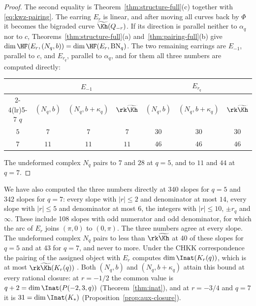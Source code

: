 \begin{proof}
The second equality is Theorem~\ref{thm:structure-full}(c) together with \eqref{eq:kwz-pairing}.  The
earring $E_r$ is linear, and after moving all curves back by $\Phi$ it becomes the bigraded curve
$\widetilde{\Kh}(Q_{-r})$.  If its direction is parallel neither to $\alpha_q$ nor to $c$,
Theorems~\ref{thm:structure-full}(a) and~\ref{thm:pairing-full}(b) give
$\dim\HF(E_r,(N_q,b))=\dim\HF(E_r,\mathrm{BN}_q)$.  The two remaining earrings are $E_{-1}$, parallel
to $c$, and $E_{r_q}$, parallel to $\alpha_q$, and for them all three numbers are computed directly:
\begin{center}
\begin{tabular}{ccccccc}
\toprule
 & \multicolumn{3}{c}{$E_{-1}$} & \multicolumn{3}{c}{$E_{r_q}$}\\
\cmidrule(lr){2-4}\cmidrule(lr){5-7}
$q$ & $(N_q,b)$ & $(N_q,b+\kappa_q)$ & $\rk\widetilde{\Kh}$ & $(N_q,b)$ & $(N_q,b+\kappa_q)$ &
 $\rk\widetilde{\Kh}$\\
\midrule
$5$ & $7$ & $7$ & $7$ & $30$ & $30$ & $30$\\
$7$ & $11$ & $11$ & $11$ & $46$ & $46$ & $46$\\
\bottomrule
\end{tabular}
\end{center}
The undeformed complex $N_q$ pairs to $7$ and $28$ at $q=5$, and to $11$ and $44$ at $q=7$.
\end{proof}

We have also computed the three numbers directly at 340 slopes for $q=5$ and 342 slopes for $q=7$:
every slope with $|r|\le2$ and denominator at most $14$, every slope with $|r|\le5$ and denominator
at most $6$, the integers with $|r|\le10$, $\pm r_q$ and $\infty$.  These include 108 slopes with odd
numerator and odd denominator, for which the arc of $E_r$ joins $(\pi,0)$ to $(0,\pi)$.  The three numbers agree
at every slope.  The undeformed complex $N_q$ pairs to less than $\rk\widetilde{\Kh}$ at 40 of these
slopes for $q=5$ and at 43 for $q=7$, and never to more.  Under the CHKK correspondence the pairing of
the assigned object with $E_r$ computes $\dim\Inat(K_r(q))$, which is at most
$\rk\widetilde{\Kh}(K_r(q))$ \cite{KM2}.  Both $(N_q,b)$ and $(N_q,b+\kappa_q)$ attain this bound at
every rational closure: at $r=-1/2$ the common value is $q+2=\dim\Inat(P(-2,3,q))$
(Theorem~\ref{thm:inat}), and at $r=-3/4$ and $q=7$ it is $31=\dim\Inat(K_*)$
(Proposition~\ref{prop:aux-closure}).

